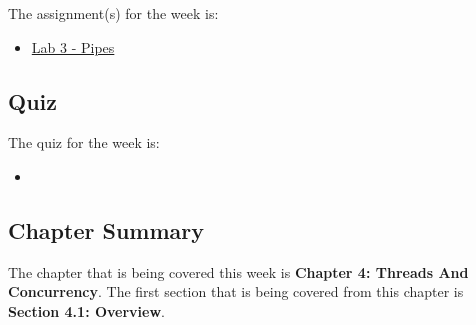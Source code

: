 The assignment(s) for the week is:

\begin{itemize}
    \item \href{https://github.com/cu-cspb-3753-fall-2024/lab-3-QuantumCompiler}{Lab 3 - Pipes}
\end{itemize}

\subsection{Quiz}

The quiz for the week is:

\begin{itemize}
    \item {}
\end{itemize}

\newpage

\subsection{Chapter Summary}

The chapter that is being covered this week is \textbf{Chapter 4: Threads And Concurrency}. The first section that is being covered from this chapter is \textbf{Section 4.1: Overview}.

